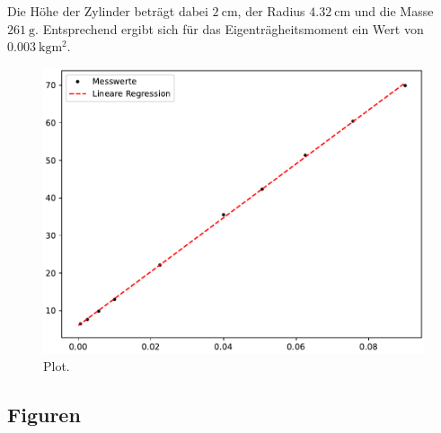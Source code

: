   Die Höhe der Zylinder beträgt dabei $\qty{2}{\centi\meter}$, der Radius $\qty{4,32}{\centi\meter}$ und die Masse $\qty{261}{\gram}$.
  Entsprechend ergibt sich für das Eigenträgheitsmoment ein Wert von $\qty{0.003}{\kilo\gram\meter\squared}$.

  \begin{figure}
    \centering
    \includegraphics{plot.pdf}
    \caption{Plot.}
    \label{fig:plot}
  \end{figure}

  

  \subsection{Figuren}


